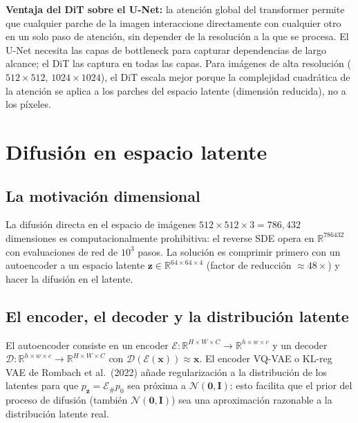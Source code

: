 \textbf{Ventaja del DiT sobre el U-Net:} la atención global del transformer
permite que cualquier parche de la imagen interaccione directamente con cualquier
otro en un solo paso de atención, sin depender de la resolución a la que se
procesa. El U-Net necesita las capas de bottleneck para capturar dependencias
de largo alcance; el DiT las captura en todas las capas. Para imágenes de alta
resolución ($512\times 512$, $1024\times 1024$), el DiT escala mejor porque la
complejidad cuadrática de la atención se aplica a los parches del espacio latente
(dimensión reducida), no a los píxeles.

\section{Difusión en espacio latente}
\label{sec:latent_diffusion}

\subsection{La motivación dimensional}
\label{subsec:latent_motivacion}

La difusión directa en el espacio de imágenes $512\times 512\times 3 =
786{,}432$ dimensiones es computacionalmente prohibitiva: el reverse SDE opera
en $\mathbb{R}^{786432}$ con evaluaciones de red de $10^3$ pasos. La solución
es comprimir primero con un autoencoder a un espacio latente $\bm{z}\in
\mathbb{R}^{64\times 64\times 4}$ (factor de reducción $\approx 48\times$) y
hacer la difusión en el latente.

\subsection{El encoder, el decoder y la distribución latente}
\label{subsec:latent_vae}

El autoencoder consiste en un encoder $\mathcal{E}: \mathbb{R}^{H\times W\times C}
\to \mathbb{R}^{h\times w\times c}$ y un decoder $\mathcal{D}: \mathbb{R}^{h\times
w\times c} \to \mathbb{R}^{H\times W\times C}$ con $\mathcal{D}(\mathcal{E}
(\bm{x})) \approx \bm{x}$. El encoder VQ-VAE o KL-reg VAE de Rombach et al.\
(2022) añade regularización a la distribución de los latentes para que
$p_{\bm{z}} = \mathcal{E}_\#p_0$ sea próxima a $\mathcal{N}(\bm{0},\bm{I})$:
esto facilita que el prior del proceso de difusión (también $\mathcal{N}(\bm{0},
\bm{I})$) sea una aproximación razonable a la distribución latente real.

